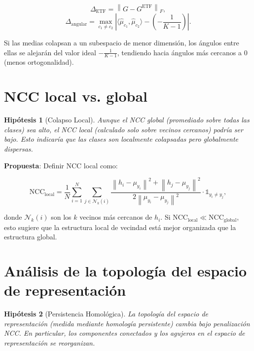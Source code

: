 \documentclass[12pt,a4paper]{report}
\newtheorem{hypothesis}{Hipótesis}[chapter]
\newcommand{\norm}[1]{\left\lVert#1\right\rVert}
\newcommand{\abs}[1]{\left\lvert#1\right\rvert}
\newcommand{\inner}[2]{\langle #1, #2 \rangle}
\newcommand{\NCC}{\text{NCC}}
\begin{document}
\begin{equation}
    \Delta_{\text{ETF}} = \norm{G - G^{\text{ETF}}}_F,
\end{equation}
\begin{equation}
    \Delta_{\text{angular}} = \max_{c_1 \neq c_2} \abs{\inner{\hat{\mu}_{c_1}}{\hat{\mu}_{c_2}} - \left(-\frac{1}{K-1}\right)}.
\end{equation}

Si las medias colapsan a un subespacio de menor dimensión, los ángulos entre ellas se alejarán del valor ideal $-\frac{1}{K-1}$, tendiendo hacia ángulos más cercanos a 0 (menos ortogonalidad).

\section{NCC local vs. global}

\begin{hypothesis}[Colapso Local]
Aunque el NCC global (promediado sobre todas las clases) sea alto, el NCC local (calculado solo sobre vecinos cercanos) podría ser bajo. Esto indicaría que las clases son localmente colapsadas pero globalmente dispersas.
\end{hypothesis}

\textbf{Propuesta}: Definir NCC local como:

\begin{equation}
    \NCC_{\text{local}} = \frac{1}{N}\sum_{i=1}^N \sum_{j \in \mathcal{N}_k(i)} \frac{\norm{h_i - \mu_{y_i}}^2 + \norm{h_j - \mu_{y_j}}^2}{2\norm{\mu_{y_i} - \mu_{y_j}}^2} \cdot \mathds{1}_{y_i \neq y_j},
\end{equation}

donde $\mathcal{N}_k(i)$ son los $k$ vecinos más cercanos de $h_i$. Si $\NCC_{\text{local}} \ll \NCC_{\text{global}}$, esto sugiere que la estructura local de vecindad está mejor organizada que la estructura global.

\section{Análisis de la topología del espacio de representación}

\begin{hypothesis}[Persistencia Homológica]
La topología del espacio de representación (medida mediante homología persistente) cambia bajo penalización NCC. En particular, los componentes conectados y los agujeros en el espacio de representación se reorganizan.
\end{hypothesis}
\end{document}
